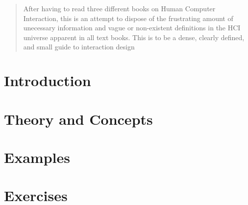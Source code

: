 \documentclass[a4, english, twoside]{article}
\theoremstyle{Example}     %
\begin{document}
\maketitle

\begin{abstract}
  \noindent After having to read three different books on Human Computer Interaction, this is an attempt to dispose of the frustrating amount of unecessary information and vague or non-existent definitions in the HCI universe apparent in all text books. This is to be a dense, clearly defined, and small guide to interaction design
\end{abstract}

\newpage
\tableofcontents

\newpage
\section{Introduction}
\label{sec:introduction}



\newpage
\section{Theory and Concepts}
\label{sec:1}








\newpage
\section{Examples}
\label{sec:2}



\newpage
\section{Exercises}
\label{sec:3}
\end{document}
